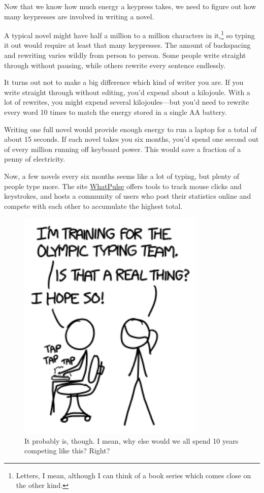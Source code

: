{{Now that we know how much energy a keypress takes, we need to figure out how many keypresses are involved in writing a novel.}

{A typical novel might have half a million to a million characters in it,{\footnote{Letters, I mean, although I can think of a book series which comes close on the other kind.} } so typing it out would require at least that many keypresses. The amount of backspacing and rewriting varies wildly from person to person. Some people write straight through without pausing, while others rewrite every sentence endlessly.}

{It turns out not to make a big difference which kind of writer you are. If you write straight through without editing, you'd expend about a kilojoule. With a lot of rewrites, you might expend several kilojoules—but you'd need to rewrite every word 10 times to match the energy stored in a single AA battery.}

{Writing one full novel would provide enough energy to run a laptop for a total of about 15 seconds. If each novel takes you six months, you'd spend one second out of every million running off keyboard power. This would save a fraction of a penny of electricity.}

{Now, a few novels every six months seems like a lot of typing, but plenty of people type more. The site \href{http://www.whatpulse.org/}{WhatPulse} offers tools to track mouse clicks and keystrokes, and hosts a community of users who post their statistics online and compete with each other to accumulate the highest total.}

\begin{figure}[!htbp]
\centering
\includegraphics[scale=0.5, max width=0.8\textwidth]{imgs/a/102/olympics.png}
\caption{It probably is, though. I mean, why else would we all spend 10 years competing like this? Right?}
\end{figure}

}
